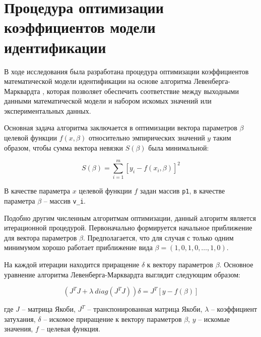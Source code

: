 
\section[Процедура оптимизации]{Процедура оптимизации коэффициентов модели идентификации}

В ходе исследования была разработана процедура оптимизации коэффициентов математической модели идентификации на основе алгоритма Левенберга-Марквардта \cite{IMM2004, gavin2011levenberg}, которая позволяет обеспечить соответствие между выходными данными математической модели и набором искомых значений или экспериментальных данных. 

Основная задача алгоритма заключается в оптимизации вектора параметров $\beta$ целевой функции $f(x, \beta)$ относительно эмпирических значений $y$ таким образом, чтобы сумма вектора невязки $S(\beta)$ была минимальной:

\begin{equation}
	S(\beta) = \sum_{i=1}^{m} [y_i - f(x_i, \beta)]^2
\end{equation}

В качестве параметра $x$ целевой функции $f$ задан массив \verb!p1!, в качестве параметра $\beta$ -- массив \verb!v_i!. 

Подобно другим численным алгоритмам оптимизации, данный алгоритм является итерационной процедурой. Первоначально формируется начальное приближение для вектора параметров $\beta$. Предполагается, что для случая с только одним минимумом хорошо работает приближение вида $\beta = (1,0, 1,0, \ldots, 1,0)$.

На каждой итерации находится приращение $\delta$ к вектору параметров $\beta$. Основное уравнение алгоритма Левенберга-Марквардта выглядит следующим образом:

\begin{equation}
	(J^T J + \lambda ~diag(J^TJ))\delta = J^T[y-f(\beta)]
	\label{eq:lm_method}
\end{equation}

\noindent где $J$ -- матрица Якоби, $J^T$ -- транспонированная матрица Якоби, $\lambda$ -- коэффициент затухания, $\delta$ -- искомое приращение к вектору параметров $\beta$, $y$ -- искомые значения, $f$ -- целевая функция.

